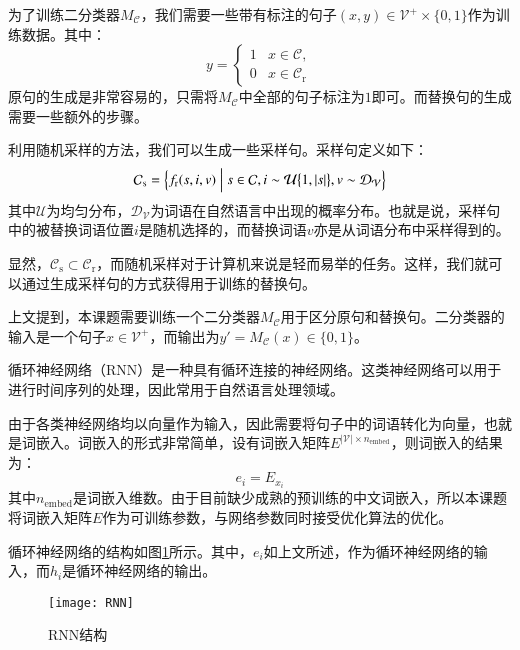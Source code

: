为了训练二分类器$M_\mathcal{C}$，我们需要一些带有标注的句子$(x, y) \in \mathcal{V}^+ \times \{0, 1\}$作为训练数据。其中：
\begin{equation}
	y = 
	\begin{cases}
		1 & x \in \mathcal{C}, \\
		0 & x \in \mathcal{C}_\text{r}
	\end{cases}
\end{equation}
原句的生成是非常容易的，只需将$M_\mathcal{C}$中全部的句子标注为$1$即可。而替换句的生成需要一些额外的步骤。

利用随机采样的方法，我们可以生成一些采样句。采样句定义如下：
\begin{equation}
\mathcal{C}_\text{s} = \Bigl\{f_\text{r}(s, i, v) \Bigm| s \in \mathcal{C}, i \sim \mathcal{U}\bigl\{1, |s|\bigr\}, v \sim \mathcal{D}_\mathcal{V}\Bigr\}
\end{equation}
其中$\mathcal{U}$为均匀分布，$\mathcal{D}_\mathcal{V}$为词语在自然语言中出现的概率分布。也就是说，采样句中的被替换词语位置$i$是随机选择的，而替换词语$v$亦是从词语分布中采样得到的。

显然，$\mathcal{C}_\text{s} \subset \mathcal{C}_\text{r}$，而随机采样对于计算机来说是轻而易举的任务。这样，我们就可以通过生成采样句的方式获得用于训练的替换句。

上文提到，本课题需要训练一个二分类器$M_\mathcal{C}$用于区分原句和替换句。二分类器的输入是一个句子$x \in \mathcal{V}^+$，而输出为$y' = M_\mathcal{C}(x) \in \{0, 1\}$。

循环神经网络（RNN）是一种具有循环连接的神经网络。这类神经网络可以用于进行时间序列的处理，因此常用于自然语言处理领域。

由于各类神经网络均以向量作为输入，因此需要将句子中的词语转化为向量，也就是词嵌入。词嵌入的形式非常简单，设有词嵌入矩阵$E^{|\mathcal{V}| \times n_{\text{embed}}}$，则词嵌入的结果为：
\begin{equation}
e_i = E_{x_i}
\end{equation}
其中$n_{\text{embed}}$是词嵌入维数。由于目前缺少成熟的预训练的中文词嵌入，所以本课题将词嵌入矩阵$E$作为可训练参数，与网络参数同时接受优化算法的优化。

循环神经网络的结构如图\ref{f:rnn}所示。其中，$e_i$如上文所述，作为循环神经网络的输入，而$h_i$是循环神经网络的输出。

\begin{figure}[htbp]
	\centering
	\texttt{[image: RNN]}
	\caption{RNN结构}
	\label{f:rnn}
	\vspace{-1em}
\end{figure}

